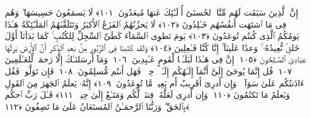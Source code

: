  إِنَّ ٱلَّذِينَ سَبَقَت لَهُم مِّنَّا ٱلحُسنَىٰٓ أُو۟لَـٰٓئِكَ عَنهَا مُبعَدُونَ ﴿١٠١﴾
 لَا يَسمَعُونَ حَسِيسَهَا ۖ وَهُم فِى مَا ٱشتَهَت أَنفُسُهُم خَـٰلِدُونَ ﴿١٠٢﴾
 لَا يَحزُنُهُمُ ٱلفَزَعُ ٱلأَكبَرُ وَتَتَلَقَّىٰهُمُ ٱلمَلَـٰٓئِكَةُ هَـٰذَا يَومُكُمُ ٱلَّذِى كُنتُم تُوعَدُونَ ﴿١٠٣﴾
 يَومَ نَطوِى ٱلسَّمَآءَ كَطَىِّ ٱلسِّجِلِّ لِلكُتُبِ ۚ كَمَا بَدَأنَآ أَوَّلَ خَلقٍۢ نُّعِيدُهُۥ ۚ وَعدًا عَلَينَآ ۚ إِنَّا كُنَّا فَـٰعِلِينَ ﴿١٠٤﴾
 وَلَقَد كَتَبنَا فِى ٱلزَّبُورِ مِنۢ بَعدِ ٱلذِّكرِ أَنَّ ٱلأَرضَ يَرِثُهَا عِبَادِىَ ٱلصَّـٰلِحُونَ ﴿١٠٥﴾
 إِنَّ فِى هَـٰذَا لَبَلَـٰغًۭا لِّقَومٍ عَـٰبِدِينَ ﴿١٠٦﴾
 وَمَآ أَرسَلنَـٰكَ إِلَّا رَحمَةًۭ لِّلعَـٰلَمِينَ ﴿١٠٧﴾
 قُل إِنَّمَا يُوحَىٰٓ إِلَىَّ أَنَّمَآ إِلَـٰهُكُم إِلَـٰهٌۭ وَٟحِدٌۭ ۖ فَهَل أَنتُم مُّسلِمُونَ ﴿١٠٨﴾
 فَإِن تَوَلَّوا۟ فَقُل ءَاذَنتُكُم عَلَىٰ سَوَآءٍۢ ۖ وَإِن أَدرِىٓ أَقَرِيبٌ أَم بَعِيدٌۭ مَّا تُوعَدُونَ ﴿١٠٩﴾
 إِنَّهُۥ يَعلَمُ ٱلجَهرَ مِنَ ٱلقَولِ وَيَعلَمُ مَا تَكتُمُونَ ﴿١١٠﴾
 وَإِن أَدرِى لَعَلَّهُۥ فِتنَةٌۭ لَّكُم وَمَتَـٰعٌ إِلَىٰ حِينٍۢ ﴿١١١﴾
 قَـٰلَ رَبِّ ٱحكُم بِٱلحَقِّ ۗ وَرَبُّنَا ٱلرَّحمَـٰنُ ٱلمُستَعَانُ عَلَىٰ مَا تَصِفُونَ ﴿١١٢﴾
 
